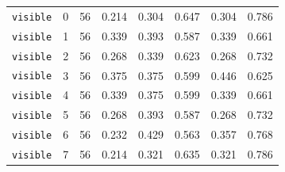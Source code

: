 \documentclass{article}
\begin{document}
\begin{center}
{\begin{tabular}{lllccccc}
\texttt{visible} & 0 & 56 & 0.214 & 0.304 & 0.647 & 0.304 & 0.786 \\
\texttt{visible} & 1 & 56 & 0.339 & 0.393 & 0.587 & 0.339 & 0.661 \\
\texttt{visible} & 2 & 56 & 0.268 & 0.339 & 0.623 & 0.268 & 0.732 \\
\texttt{visible} & 3 & 56 & 0.375 & 0.375 & 0.599 & 0.446 & 0.625 \\
\texttt{visible} & 4 & 56 & 0.339 & 0.375 & 0.599 & 0.339 & 0.661 \\
\texttt{visible} & 5 & 56 & 0.268 & 0.393 & 0.587 & 0.268 & 0.732 \\
\texttt{visible} & 6 & 56 & 0.232 & 0.429 & 0.563 & 0.357 & 0.768 \\
\texttt{visible} & 7 & 56 & 0.214 & 0.321 & 0.635 & 0.321 & 0.786 \\
\bottomrule
\end{tabular}%
}
\end{center}
\normalsize
\end{document}
